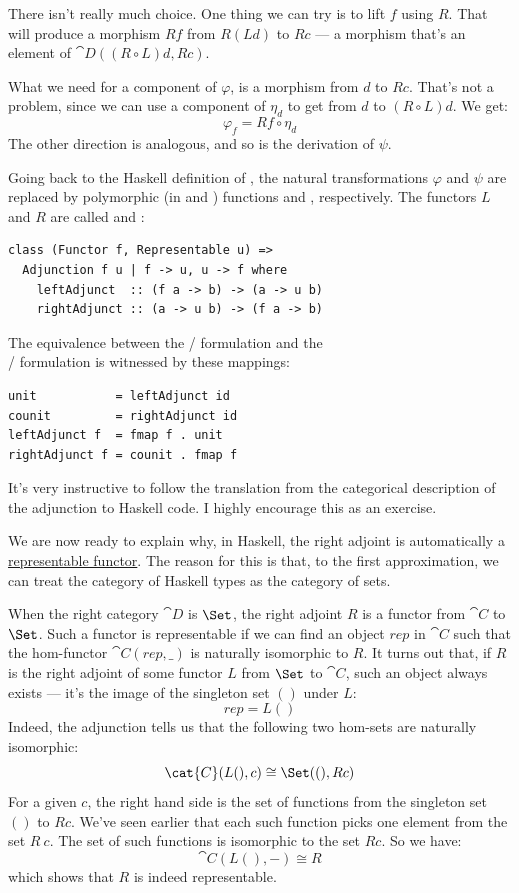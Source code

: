 There isn't really much choice. One thing we can try is to lift
$f$ using $R$. That will produce a morphism $R f$
from $R (L d)$ to $R c$ --- a morphism that's an
element of $\cat{D}((R \circ L) d, R c)$.

What we need for a component of $\varphi$, is a morphism from
$d$ to $R c$. That's not a problem, since we can use a
component of $\eta_d$ to get from $d$ to
$(R \circ L) d$. We get:
\[\varphi_f = R f \circ \eta_d\]
The other direction is analogous, and so is the derivation of $\psi$.

Going back to the Haskell definition of , the natural
transformations $\varphi$ and $\psi$ are replaced by polymorphic
(in  and ) functions  and
, respectively. The functors $L$ and
$R$ are called  and :

\begin{Verbatim}
class (Functor f, Representable u) => 
  Adjunction f u | f -> u, u -> f where
    leftAdjunct  :: (f a -> b) -> (a -> u b)
    rightAdjunct :: (a -> u b) -> (f a -> b) 
\end{Verbatim}
The equivalence between the / formulation
and the\\ / formulation is
witnessed by these mappings:

\begin{Verbatim}
unit           = leftAdjunct id
counit         = rightAdjunct id
leftAdjunct f  = fmap f . unit
rightAdjunct f = counit . fmap f
\end{Verbatim}
It's very instructive to follow the translation from the categorical
description of the adjunction to Haskell code. I highly encourage this
as an exercise.

We are now ready to explain why, in Haskell, the right adjoint is
automatically a \hyperref[representable-functors]{representable
functor}. The reason for this is that, to the first approximation, we
can treat the category of Haskell types as the category of sets.

When the right category $\cat{D}$ is $\Set$, the right adjoint
$R$ is a functor from $\cat{C}$ to $\Set$. Such a functor is
representable if we can find an object $rep$ in $\cat{C}$ such
that the hom-functor $\cat{C}(rep, \_)$ is naturally isomorphic to
$R$. It turns out that, if $R$ is the right adjoint of
some functor $L$ from $\Set$ to $\cat{C}$, such an object
always exists --- it's the image of the singleton set $()$ under
$L$:
\[rep = L ()\]
Indeed, the adjunction tells us that the following two hom-sets are
naturally isomorphic:
\[\cat{C}(L (), c) \cong \Set((), R c)\]
For a given $c$, the right hand side is the set of functions from
the singleton set $()$ to $R c$. We've seen earlier that
each such function picks one element from the set $R\ c$. The set
of such functions is isomorphic to the set $R c$. So we have:
\[\cat{C}(L (), -) \cong R\]
which shows that $R$ is indeed representable.


